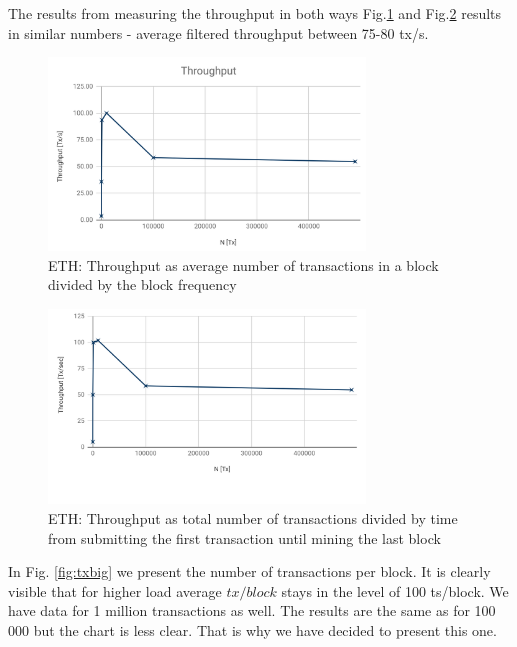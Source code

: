  
 
The results from measuring the throughput in both ways Fig.\ref{fig:throughput1} and Fig.\ref{fig:throughput2} results in similar numbers - average filtered throughput between 75-80 tx/s.
 
\begin{figure}[!h]
    \centering
    \includegraphics[width=0.75\textwidth]{img/Throughput_ETH.png}
   \caption{ETH: Throughput as average number of transactions in a block divided by the block frequency}
   \label{fig:throughput1}
\end{figure}
 
\begin{figure}[!h]
    \centering
    \includegraphics[width=0.75\textwidth]{img/Throughputalt.png}
   \caption{ETH: Throughput as total number of transactions divided by time from submitting the first transaction until mining the last block}
   \label{fig:throughput2}
\end{figure}
 
In Fig. \ref{fig:txbig} we present the number of transactions per block. It is clearly visible that for  higher load average $tx/block$ stays in the level of 100 ts/block. We have data for 1 million transactions as well. The results are the same as for 100 000 but the chart is less clear. That is why we have decided to present this one.
 
